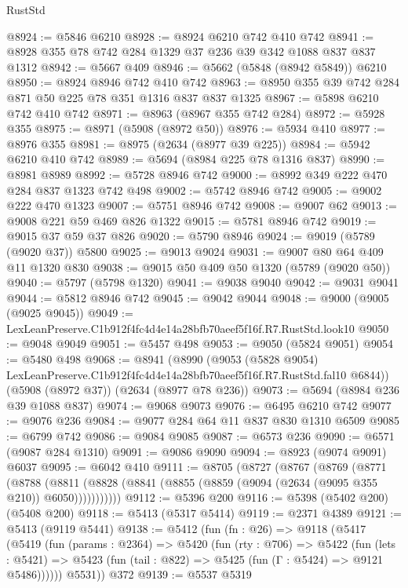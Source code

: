\begin{lexlean}{RustStd}
\begin{coremodule}
@8924 := @5846 @6210
@8928 := @8924 @6210 @742 @410 @742
@8941 := @8928 @355 @78 @742 @284 @1329 @37 @236 @39 @342 @1088 @837 @837 @1312
@8942 := @5667 @409
@8946 := @5662 (@5848 (@8942 @5849)) @6210
@8950 := @8924 @8946 @742 @410 @742
@8963 := @8950 @355 @39 @742 @284 @871 @50 @225 @78 @351 @1316 @837 @837 @1325
@8967 := @5898 @6210 @742 @410 @742
@8971 := @8963 (@8967 @355 @742 @284)
@8972 := @5928 @355
@8975 := @8971 (@5908 (@8972 @50))
@8976 := @5934 @410
@8977 := @8976 @355
@8981 := @8975 (@2634 (@8977 @39 @225))
@8984 := @5942 @6210 @410 @742
@8989 := @5694 (@8984 @225 @78 @1316 @837)
@8990 := @8981 @8989
@8992 := @5728 @8946 @742
@9000 := @8992 @349 @222 @470 @284 @837 @1323 @742 @498
@9002 := @5742 @8946 @742
@9005 := @9002 @222 @470 @1323
@9007 := @5751 @8946 @742
@9008 := @9007 @62
@9013 := @9008 @221 @59 @469 @826 @1322
@9015 := @5781 @8946 @742
@9019 := @9015 @37 @59 @37 @826
@9020 := @5790 @8946
@9024 := @9019 (@5789 (@9020 @37)) @5800
@9025 := @9013 @9024
@9031 := @9007 @80 @64 @409 @11 @1320 @830
@9038 := @9015 @50 @409 @50 @1320 (@5789 (@9020 @50))
@9040 := @5797 (@5798 @1320)
@9041 := @9038 @9040
@9042 := @9031 @9041
@9044 := @5812 @8946 @742
@9045 := @9042 @9044
@9048 := @9000 (@9005 (@9025 @9045))
@9049 := LexLeanPreserve.C1b912f4fc4d4e14a28bfb70aeef5f16f.R7.RustStd.look10
@9050 := @9048 @9049
@9051 := @5457 @498
@9053 := @9050 (@5824 @9051)
@9054 := @5480 @498
@9068 := @8941
    (@8990
      (@9053
        (@5828 @9054)
        LexLeanPreserve.C1b912f4fc4d4e14a28bfb70aeef5f16f.R7.RustStd.fal10
        @6844))
    (@5908 (@8972 @37))
    (@2634 (@8977 @78 @236))
@9073 := @5694 (@8984 @236 @39 @1088 @837)
@9074 := @9068 @9073
@9076 := @6495 @6210 @742
@9077 := @9076 @236
@9084 := @9077 @284 @64 @11 @837 @830 @1310 @6509
@9085 := @6799 @742
@9086 := @9084 @9085
@9087 := @6573 @236
@9090 := @6571 (@9087 @284 @1310)
@9091 := @9086 @9090
@9094 := @8923 (@9074 @9091) @6037
@9095 := @6042 @410
@9111 := @8705
    (@8727
      (@8767
        (@8769
          (@8771
            (@8788
              (@8811 (@8828 (@8841 (@8855 (@8859 (@9094 (@2634 (@9095 @355 @210)) @6050)))))))))))
@9112 := @5396 @200
@9116 := @5398 (@5402 @200) (@5408 @200)
@9118 := @5413 (@5317 @5414)
@9119 := @2371 @4389
@9121 := @5413 (@9119 @5441)
@9138 := @5412
    (fun (fn : @26) =>
    @9118
      (@5417
        (@5419
          (fun (params : @2364) =>
          @5420
            (fun (rty : @706) =>
            @5422
              (fun (lets : @5421) =>
              @5423 (fun (tail : @822) => @5425 (fun (Γ : @5424) => @9121 @5486))))))
        @5531))
    @372
@9139 := @5537 @5319

\end{coremodule}
\end{lexlean}
